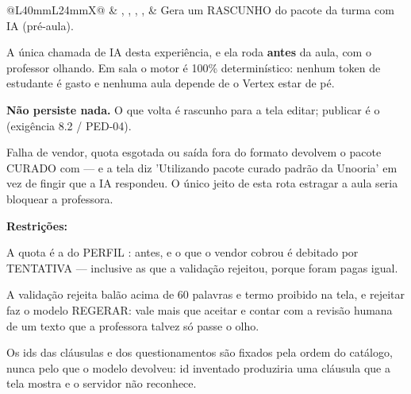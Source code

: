 \begin{tabularx}{\linewidth}{@{}L{40mm}L{24mm}X@{}}
\zebra {} & , , , ,  & Gera um RASCUNHO do pacote da turma com IA (pré-aula).\par A única chamada de IA desta experiência, e ela roda \textbf{antes} da aula, com o professor olhando. Em sala o motor é 100\% determinístico: nenhum token de estudante é gasto e nenhuma aula depende de o Vertex estar de pé.\par \textbf{Não persiste nada.} O que volta é rascunho para a tela editar; publicar é o  (exigência 8.2 / PED-04).\par Falha de vendor, quota esgotada ou saída fora do formato devolvem o pacote CURADO com  --- e a tela diz 'Utilizando pacote curado padrão da Unooria' em vez de fingir que a IA respondeu. O único jeito de esta rota estragar a aula seria bloquear a professora.\par \textbf{Restrições:}\par \hspace*{1em}\textbullet{} A quota é a do PERFIL :  antes, e o que o vendor cobrou é debitado por TENTATIVA --- inclusive as que a validação rejeitou, porque foram pagas igual.\par \hspace*{1em}\textbullet{} A validação rejeita balão acima de 60 palavras e termo proibido na tela, e rejeitar faz o modelo REGERAR: vale mais que aceitar e contar com a revisão humana de um texto que a professora talvez só passe o olho.\par \hspace*{1em}\textbullet{} Os ids das cláusulas e dos questionamentos são fixados pela ordem do catálogo, nunca pelo que o modelo devolveu: id inventado produziria uma cláusula que a tela mostra e o servidor não reconhece.\\

\end{tabularx}
